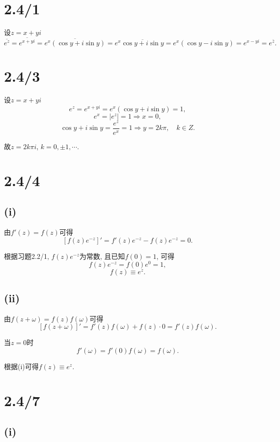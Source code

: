 \documentclass[11pt,a4paper]{article}
\author{刘逸灏 (515370910207)}
\begin{document}
\maketitle

\section{2.4/1}

设$z=x+yi$
$$\overline{e^z}=\overline{e^{x+yi}}=\overline{e^x(\cos y+i\sin y)}=e^x\overline{\cos y+i\sin y}=e^x(\cos y-i\sin y)=e^{x-yi}=e^{\bar{z}}.$$

\section{2.4/3}

设$z=x+yi$
$$e^z=e^{x+yi}=e^x(\cos y+i\sin y)=1,$$
$$e^x=|e^z|=1 \Longrightarrow x=0,$$
$$\cos y+i\sin y=\frac{e^z}{e^x}=1 \Longrightarrow y=2k\pi, \quad k\in Z.$$

故$z=2k\pi i$, $k=0,\pm1,\cdots$.

\section{2.4/4}

\subsection*{(i)}

由$f'(z)=f(z)$可得
$$[f(z)e^{-z}]'=f'(z)e^{-z}-f(z)e^{-z}=0.$$

根据习题2.2/1, $f(z)e^{-z}$为常数, 且已知$f(0)=1$, 可得
$$f(z)e^{-z}=f(0)e^0=1,$$
$$f(z)\equiv e^z.$$

\subsection*{(ii)}

由$f(z+\omega)=f(z)f(\omega)$可得
$$[f(z+\omega)]'=f'(z)f(\omega)+f(z)\cdot 0=f'(z)f(\omega).$$

当$z=0$时
$$f'(\omega)=f'(0)f(\omega)=f(\omega).$$

根据(i)可得$f(z)\equiv e^z$.

\section{2.4/7}

\subsection*{(i)}
\end{document}
